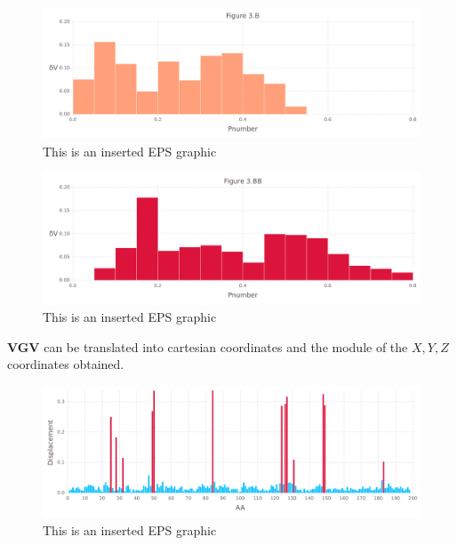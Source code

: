 \documentclass[10pt,letterpaper]{article}
\begin{document}
\begin{figure}[ht]
\begin{center}
\includegraphics[scale=0.5]{1hvr_hol/3bfigure_very_hi-precision.pdf}
\caption{This is an inserted EPS graphic}
\label{fig10}
\end{center}
\end{figure}

\begin{figure}[ht]
\begin{center}
\includegraphics[scale=0.5]{1hvr_hol/3bbfigure_very_hi-precision.pdf}
\caption{This is an inserted EPS graphic}
\label{fig11}
\end{center}
\end{figure}

\FloatBarrier


\textbf{VGV} can be translated into cartesian coordinates and the module of the \(X, Y, Z\) coordinates obtained.

\begin{figure}[ht]
\begin{center}
\includegraphics[scale=0.5]{1hvr_hol/5figure_very_hi-precision.pdf}
\caption{This is an inserted EPS graphic}
\label{fig13}
\end{center}
\end{figure}
\end{document}
